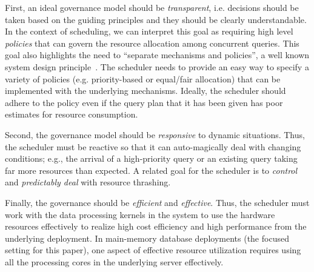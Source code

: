 First, an ideal governance model should be \textit{transparent}, i.e. decisions should be taken based on the guiding principles and they should be clearly understandable.
In the context of scheduling, we can interpret this goal as requiring high level \textit{policies} that can govern the resource allocation among concurrent queries. 
This goal also highlights the need to ``separate mechanisms and policies'', a well known system design principle~\cite{LampsonS76}.
The scheduler needs to provide an easy way to specify a variety of policies (e.g. priority-based or equal/fair allocation) that can be implemented with the underlying mechanisms.
Ideally, the scheduler should adhere to the policy even if the query plan that it has been given has poor estimates for resource consumption.

Second, the governance model should be \textit{responsive} to dynamic situations. 
Thus, the scheduler must be reactive so that it can auto-magically deal with changing conditions; e.g., the arrival of a high-priority query or an existing query taking far more resources than expected. 
A related goal for the scheduler is to \textit{control} and \textit{predictably deal} with resource thrashing.

Finally, the governance should be \textit{efficient} and \textit{effective}. 
Thus, the scheduler must work with the data processing kernels in the system to use the hardware resources effectively to realize high cost efficiency and high performance from the underlying deployment. 
In main-memory database deployments (the focused setting for this paper), one aspect of effective resource utilization requires using all the processing cores in the underlying server effectively. 


